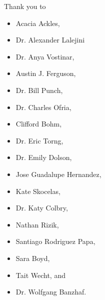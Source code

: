 Thank you to
\begin{itemize}
  \item Acacia Ackles,
  \item Dr. Alexander Lalejini
  \item Dr. Anya Vostinar,
  \item Austin J. Ferguson,
  \item Dr. Bill Punch,
  \item Dr. Charles Ofria,
  \item Clifford Bohm,
  \item Dr. Eric Torng,
  \item Dr. Emily Dolson,
  \item Jose Guadalupe Hernandez,
  \item Kate Skocelas,
  \item Dr. Katy Colbry,
  \item Nathan Rizik,
  \item Santiago Rodriguez Papa,
  \item Sara Boyd,
  \item Tait Wecht, and
  \item Dr. Wolfgang Banzhaf.
\end{itemize}
